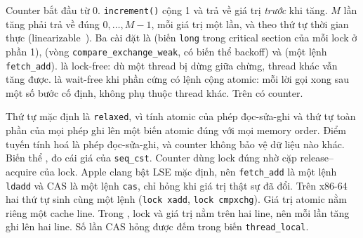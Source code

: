 Counter bắt đầu từ 0. \texttt{increment()} cộng 1 và trả về giá trị \emph{trước} khi tăng. $M$ lần tăng
phải trả về đúng $0, \dots, M - 1$, mỗi giá trị một lần, và theo thứ tự thời gian thực
(linearizable~\cite{herlihy1990linearizability}). Ba cài đặt là  (biến
\texttt{long} trong critical section của mỗi lock ở phần 1),  (vòng
\texttt{compare\_exchange\_weak}, có biến thể backoff) và  (một lệnh
\texttt{fetch\_add}).  là lock-free: dù một thread bị dừng giữa chừng, thread khác vẫn
tăng được.  là wait-free khi phần cứng có lệnh cộng atomic: mỗi lời gọi xong sau một
số bước cố định, không phụ thuộc thread khác. Trên  có 
counter.

Thứ tự mặc định là \texttt{relaxed}, vì tính atomic của phép đọc-sửa-ghi và thứ tự toàn phần của mọi phép
ghi lên một biến atomic đúng với mọi memory order. Điểm tuyến tính hoá là phép đọc-sửa-ghi, và counter
không bảo vệ dữ liệu nào khác. Biến thể ,  đo cái giá của
\texttt{seq\_cst}. Counter dùng lock đúng nhờ cặp release--acquire của lock. Apple clang bật LSE mặc
định, nên \texttt{fetch\_add} là một lệnh \texttt{ldadd} và CAS là một lệnh \texttt{cas}, chỉ hỏng khi
giá trị thật sự đã đổi. Trên x86-64 hai thứ tự sinh cùng một lệnh (\texttt{lock xadd},
\texttt{lock cmpxchg}). Giá trị atomic nằm riêng một cache line. Trong , lock và giá
trị nằm trên hai line, nên mỗi lần tăng ghi lên hai line. Số lần CAS hỏng được đếm trong biến
\texttt{thread\_local}.
